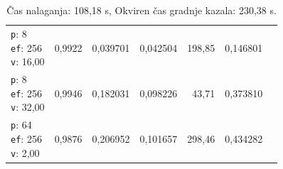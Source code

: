 \begin{table}[htbp]
\begin{tabularx}{\textwidth}{Xrrrrrr}
    \makecell{\texttt{p}: 8\\\texttt{ef}: 256\\\texttt{v}: 16,00} & 0,9922 & 0,039701 & 0,042504 & 198,85 & 0,146801 \\
    \makecell{\texttt{p}: 8\\\texttt{ef}: 256\\\texttt{v}: 32,00} & 0,9946 & 0,182031 & 0,098226 & 43,71 & 0,373810 \\
    \makecell{\texttt{p}: 64\\\texttt{ef}: 256\\\texttt{v}: 2,00} & 0,9876 & 0,206952 & 0,101657 & 298,46 & 0,434282 \\
    \bottomrule
  \end{tabularx}
\caption* {Čas nalaganja: 108,18 s, Okviren čas gradnje kazala: 230,38 s.}\end{table}


